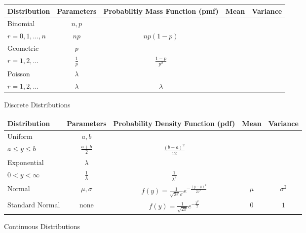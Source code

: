 \documentclass[12pt]{article}
\begin{document}
\begin{figure}[H]
\caption{Discrete Distributions}
\begin{tabular}{l c c c c}
\hline
Distribution & Parameters & Probabiltiy Mass Function (pmf) & Mean & Variance \\
\hline
Binomial & $n, p$ & \makecell{ $\displaystyle p(r) = \binom{n}{r}p^r(1-p)^{n-r}$\\$ \displaystyle r = 0, 1, \dots, n$} & $np$ & $np(1-p)$ \\
Geometric & $p$ & \makecell{ $\displaystyle p(r) = p(1-p)^{r-1}$ \\ $r = 1, 2, \dots$} & $ \displaystyle \frac{1}{p}$ & $\displaystyle \frac{1 - p}{p^2}$ \\
Poisson & $\lambda$ & \makecell{ $\displaystyle p(r) = \frac{\lambda^r e^{-\lambda}}{r!}$ \\ $r = 1, 2, \dots$ } & $\lambda$ & $\lambda$ \\
\end{tabular}
\end{figure}

\vspace{2cm}

\begin{figure}[H]
\caption{Continuous Distributions}
\begin{tabular}{l c c c c}
\hline
Distribution & Parameters & Probability Density Function (pdf) & Mean & Variance \\
\hline
Uniform & $a, b$ & \makecell{ $\displaystyle f(y) = \frac{1}{b-a}$ \\ $a \leq y \leq b$ }& $\displaystyle \frac{a + b}{2}$ & $\displaystyle \frac{(b - a)^2}{12}$ \\
Exponential & $\lambda$ & \makecell{ $\displaystyle f(y) = \lambda e^{-\lambda y}$ \\ $0 < y < \infty$} & $\displaystyle \frac{1}{\lambda}$ & $\displaystyle \frac{1}{\lambda^2}$ \\
Normal & $\mu, \sigma$ & $\displaystyle f(y) = \frac{1}{\sqrt{2 \pi}\sigma}e^{- \frac{(y - \mu)^2}{2 \sigma^2}}$ & $\mu$ & $\sigma^2$ \\
Standard Normal & none & $\displaystyle f(y) = \frac{1}{\sqrt{2 \pi}}e^{- \frac{y^2}{2}}$ & $0$ & $1$ \\
\end{tabular}
\end{figure}
\end{document}
